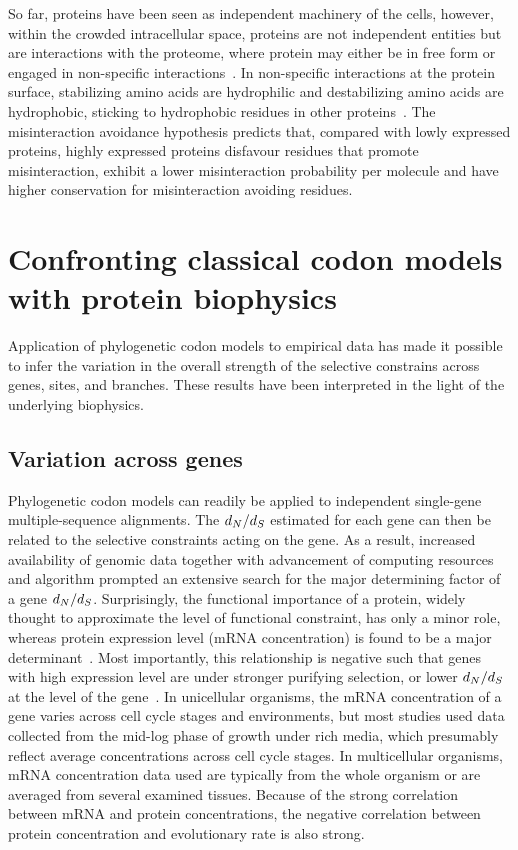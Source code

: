 So far, proteins have been seen as independent machinery of the cells, however, within the crowded intracellular space, proteins are not independent entities but are interactions with the proteome, where protein may either be in free form or engaged in non-specific interactions~\citep{Yang2012, Zhang2013}.
In non-specific interactions at the protein surface, stabilizing amino acids are hydrophilic and destabilizing amino acids are hydrophobic, sticking to hydrophobic residues in other proteins~\citep{Dixit2013,Manhart2015}.
The misinteraction avoidance hypothesis predicts that, compared with lowly expressed proteins, highly expressed proteins disfavour residues that promote misinteraction, exhibit a lower misinteraction probability per molecule and have higher conservation for misinteraction avoiding residues.

\section{Confronting classical codon models with protein biophysics}
\label{sec:classical-codon-biophysics}

Application of phylogenetic codon models to empirical data has made it possible to infer the variation in the overall strength of the selective constrains across genes, sites, and branches.
These results have been interpreted in the light of the underlying biophysics.

\subsection{Variation across genes}
\label{subsec:thermo-variation-across-genes}

Phylogenetic codon models can readily be applied to independent single-gene multiple-sequence alignments.
The $d_N / d_S$ estimated for each gene can then be related to the selective constraints acting on the gene.
As a result, increased availability of genomic data together with advancement of computing resources and algorithm prompted an extensive search for the major determining factor of a gene $d_N / d_S$.
Surprisingly, the functional importance of a protein, widely thought to approximate the level of functional constraint, has only a minor role, whereas protein expression level (mRNA concentration) is found to be a major determinant~\citep{Zhang2015}.
Most importantly, this relationship is negative such that genes with high expression level are under stronger purifying selection, or lower $d_N / d_S$ at the level of the gene~\citep{Duret2000, Drummond2005a, Zhang2015}.
In unicellular organisms, the mRNA concentration of a gene varies across cell cycle stages and environments, but most studies used data collected from the mid-log phase of growth under rich media, which presumably reflect average concentrations across cell cycle stages.
In multicellular organisms, mRNA concentration data used are typically from the whole organism or are averaged from several examined tissues.
Because of the strong correlation between mRNA and protein concentrations, the negative correlation between protein concentration and evolutionary rate is also strong.

